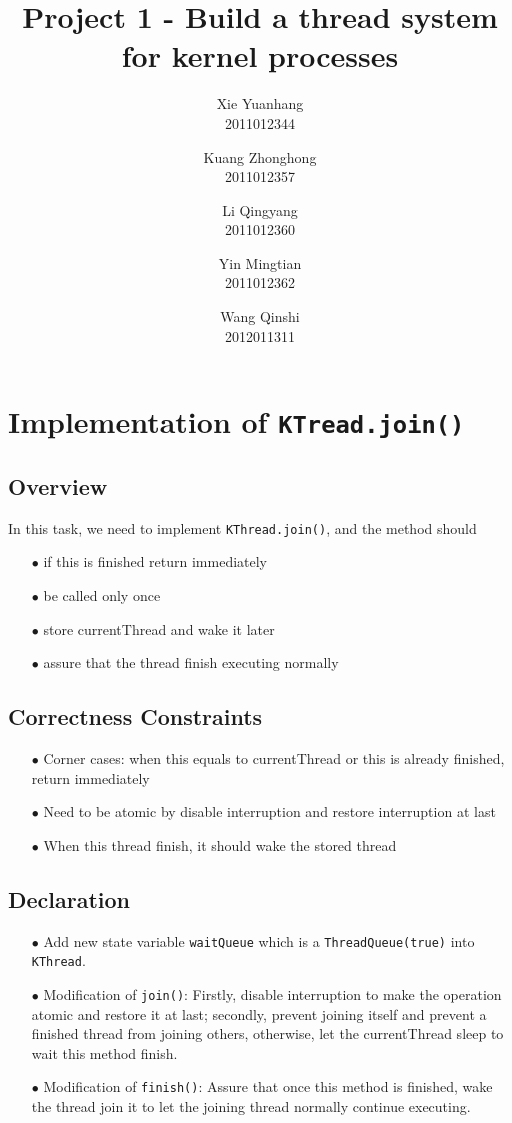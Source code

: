 \documentclass{article}
\title{Project 1 - Build a thread system for kernel processes}
\author{Xie Yuanhang\\ 2011012344\and
Kuang Zhonghong\\ 2011012357\and
Li Qingyang\\ 2011012360\and
Yin Mingtian\\ 2011012362\and
Wang Qinshi\\ 2012011311}
\date{}
\begin{document}
\maketitle
\tableofcontents{}
 \section{Implementation of \texttt{KTread.join()}}
\subsection{Overview}
In this task, we need to implement \texttt{KThread.join()}, and the method should 
\begin{enumerate}
	\item[$\bullet$] if this is finished return immediately
	\item[$\bullet$] be called only once
	\item[$\bullet$] store currentThread and wake it later
	\item[$\bullet$] assure that the thread finish executing normally
\end{enumerate}
\subsection{Correctness Constraints}
\begin{enumerate}
	\item[$\bullet$] Corner cases: when this equals to currentThread or this is already finished, return immediately
	\item[$\bullet$] Need to be atomic by disable interruption and restore interruption at last
	\item[$\bullet$] When this thread finish, it should wake the stored thread
\end{enumerate}
\subsection{Declaration}
\begin{enumerate}
	\item[$\bullet$] Add new state variable \texttt{waitQueue} which is a \texttt{ThreadQueue(true)} into \texttt{KThread}.
	\item[$\bullet$] Modification of \texttt{join()}:
		Firstly, disable interruption to make the operation atomic and restore it at last; 
		secondly, prevent joining itself and prevent a finished thread from joining others, otherwise, let the currentThread sleep to wait this method finish.
	\item[$\bullet$] Modification of \texttt{finish()}:
		Assure that once this method is finished, wake the thread join it to let the joining thread normally continue executing.
\end{enumerate}
\end{document}
